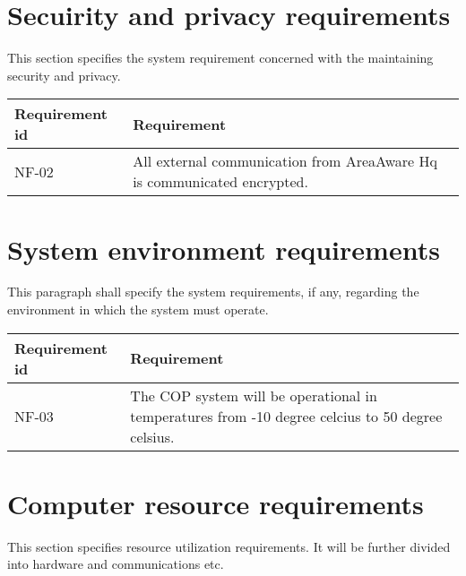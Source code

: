 

\section{Secuirity and privacy requirements}
This section specifies the system requirement concerned with the maintaining security and privacy.

\begin{longtable}{| p{3.2cm} |  p{10cm} | }
	\hline
	\textbf{Requirement id} &  \textbf{Requirement } \\
	\hline
	NF-02 &All external communication from AreaAware Hq is communicated encrypted.  \\
	\hline
\end{longtable}

\section{System environment requirements}
This paragraph shall specify the system requirements, if any, regarding the environment in which the system must operate.

\begin{longtable}{| p{3.2cm} |  p{10cm} | }
	\hline
	\textbf{Requirement id} &  \textbf{Requirement } \\
	\hline
	NF-03 & The COP system will be operational in temperatures from -10 degree celcius to 50 degree celsius.  \\
	\hline
\end{longtable}

\section{Computer resource requirements}
This section specifies resource utilization requirements. It will be further divided into hardware and communications etc.


